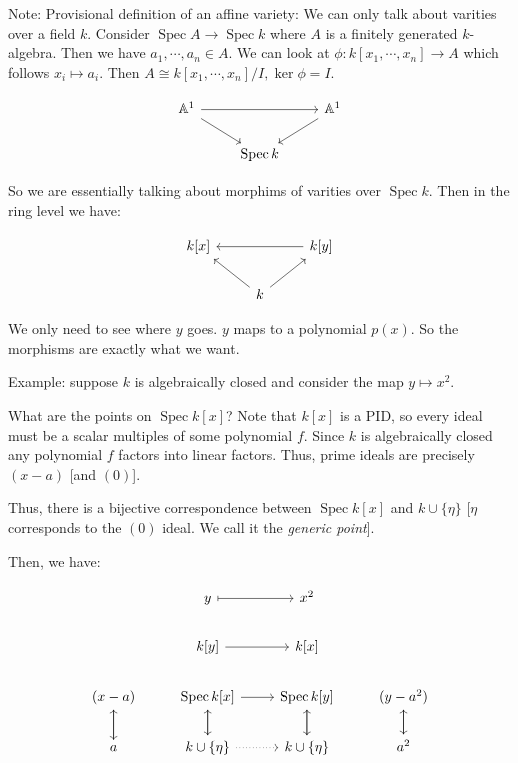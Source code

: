 \documentclass{article}
\theoremstyle{definition}
\begin{document}
    Note: Provisional definition of an affine variety: We can only talk about varities over a field \(k\). Consider \(\operatorname{Spec} A \to \operatorname{Spec} k\) where \(A\) is a finitely generated \(k\)-algebra. Then we have \(a_1, \cdots , a_n \in A\). We can look at \(\phi: k[x_1, \cdots , x_n] \to A\) which follows \(x_i \mapsto a_i\). Then \(A \cong k[x_1, \cdots , x_n] / I, \ker \phi = I\). 

    \[
        \begin{tikzcd}
            \mathbb{A}^1 \ar[rr] \ar[rd] & & \mathbb{A}^1 \ar[ld] \\ & \operatorname{Spec} k
        \end{tikzcd}
    \]

    So we are essentially talking about morphims of varities over \(\operatorname{Spec} k\). Then in the ring level we have: 

    \[
        \begin{tikzcd}
            k[x] & & k[y] \ar[ll] \\ & k \ar[ul] \ar[ur]
        \end{tikzcd}
    \]

    We only need to see where \(y\) goes. \(y\) maps to a polynomial \(p(x)\). So the morphisms are exactly what we want.

    Example: suppose \(k\) is algebraically closed and consider the map \(y \mapsto x^2\).

    What are the points on \(\operatorname{Spec} k[x]\)? Note that \(k[x]\) is a PID, so every ideal must be a scalar multiples of some polynomial \(f\). Since \(k\) is algebraically closed any polynomial \(f\) factors into linear factors. Thus, prime ideals are precisely \((x-a)\) [and \((0)\)].

    Thus, there is a bijective correspondence between \(\operatorname{Spec} k[x]\) and \(k \cup \{ \eta \}\) [\(\eta\) corresponds to the \((0)\) ideal. We call it the \textit{generic point}].
    
    Then, we have:

    \[
        \begin{tikzcd}
            & y \ar[r, mapsto] & x^2 \\
            & k[y] \ar[r] & k[x] \\
            (x-a) \ar[d] & \operatorname{Spec} k[x] \ar[r] \ar[d] & \operatorname{Spec} k[y] \ar[d] & (y - a^2) \ar[d] \\
            a\ar[u] & k \cup \{ \eta \} \ar[u] \ar[r, dotted] & k \cup \{ \eta \} \ar[u] & a^2 \ar[u]
        \end{tikzcd}
    \]
\end{document}
